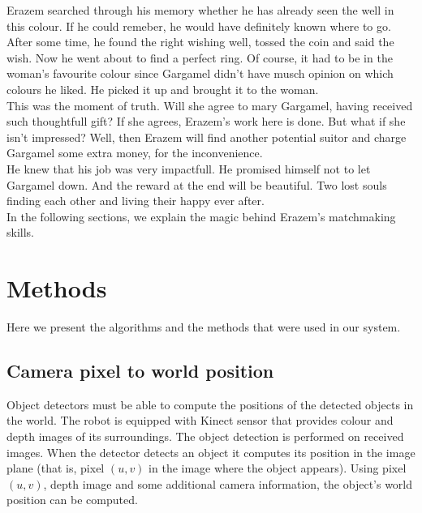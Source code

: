 \documentclass[12pt,a4paper]{article}
\begin{document}
	Erazem searched through his memory whether he has already seen the well in this colour. If he could remeber, he would have definitely known where to go. After some time, he found the right wishing well, tossed the coin and said the wish. Now he went about to find a perfect ring. Of course, it had to be in the woman's favourite colour since Gargamel didn't have musch opinion on which colours he liked. He picked it up and brought it to the woman. \\
	
	This was the moment of truth. Will she agree to mary Gargamel, having received such thoughtfull gift? If she agrees, Erazem's work here is done. But what if she isn't impressed? Well, then Erazem will find another potential suitor and charge Gargamel some extra money, for the inconvenience. \\

	He knew that his job was very impactfull. He promised himself not to let Gargamel down. And the reward at the end will be beautiful. Two lost souls finding each other and living their happy ever after. \\

	In the following sections, we explain the magic behind Erazem's matchmaking skills.
	
	\section{Methods} \label{methods}
	Here we present the algorithms and the methods that were used in our system.

	
	\subsection{Camera pixel to world position} \label{pixel_to_world}
	Object detectors must be able to compute the positions of the detected objects in the world. The robot is equipped with Kinect sensor that provides colour and depth images of its surroundings. The object detection is performed on received images. When the detector detects an object it computes its position in the image plane (that is, pixel $(u, v)$ in the image where the object appears). Using pixel $(u, v)$, depth image and some additional camera information, the object's world position can be computed. \\
	
\end{document}
